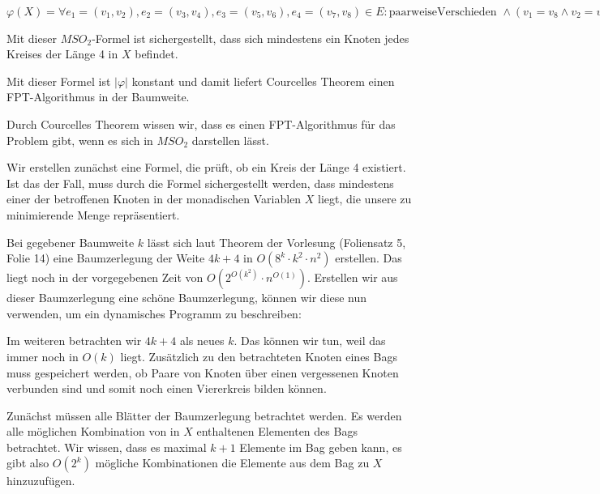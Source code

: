 

\DeclareMathOperator{\vc}{vc}





\subexercise

$\varphi(X) = \forall e_1 = (v_1, v_2), e_2 = (v_3, v_4), e_3 = (v_5, v_6), e_4 = (v_7, v_8) \in E \colon \text{paarweiseVerschieden } \wedge (v_1 = v_8 \wedge v_2 = v_3 \wedge v_4 = v_5 \wedge v_6 = v_7) \rightarrow \{v_1, \dots, v_8\} \cap X \neq \emptyset$

Mit dieser $MSO_2$-Formel ist sichergestellt, dass sich mindestens ein Knoten jedes Kreises der Länge 4 in $X$ befindet.

Mit dieser Formel ist $|\varphi|$ konstant und damit liefert Courcelles Theorem einen FPT-Algorithmus in der Baumweite.
\how

Durch Courcelles Theorem wissen wir, dass es einen FPT-Algorithmus für das Problem gibt, wenn es sich in $MSO_2$ darstellen lässt.

Wir erstellen zunächst eine Formel, die prüft, ob ein Kreis der Länge 4 existiert. Ist das der Fall, muss durch die Formel sichergestellt werden, dass mindestens einer der betroffenen Knoten in der monadischen Variablen $X$ liegt, die unsere zu minimierende Menge repräsentiert.

\subexercise

Bei gegebener Baumweite $k$ lässt sich laut Theorem der Vorlesung (Foliensatz 5, Folie 14) eine Baumzerlegung der Weite $4k+4$ in $O(8^k\cdot k^2\cdot n^2)$ erstellen. Das liegt noch in der vorgegebenen Zeit von $O(2^{O(k^2)}\cdot n^{O(1)})$. Erstellen wir aus dieser Baumzerlegung eine schöne Baumzerlegung, können wir diese nun verwenden, um ein dynamisches Programm zu beschreiben:

Im weiteren betrachten wir $4k+4$ als neues $k$. Das können wir tun, weil das immer noch in $O(k)$ liegt. Zusätzlich zu den betrachteten Knoten eines Bags muss gespeichert werden, ob Paare von Knoten über einen vergessenen Knoten verbunden sind und somit noch einen Viererkreis bilden können.

Zunächst müssen alle Blätter der Baumzerlegung betrachtet werden. Es werden alle möglichen Kombination von in $X$ enthaltenen Elementen des Bags betrachtet. Wir wissen, dass es maximal $k+1$ Elemente im Bag geben kann, es gibt also $O(2^k)$ mögliche Kombinationen die Elemente aus dem Bag zu $X$ hinzuzufügen.

